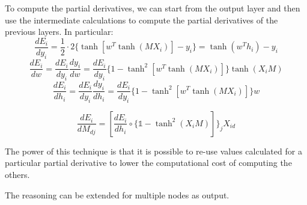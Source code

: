 To compute the partial derivatives, we can start from the output layer and then use the intermediate calculations to compute
the partial derivatives of the previous layers.
In particular:
$$ \frac{dE_i}{dy_i} = \frac{1}{2} \cdot 2 \{ \tanh[w^T \tanh(M X_i)] - y_i\} = \tanh(w^T h_i) - y_i $$
$$ \frac{dE_i}{dw} = \frac{dE_i}{dy_i} \frac{dy_i}{dw} = \frac{dE_i}{dy_i} \{1 - \tanh^2[w^T \tanh(M X_i)]\} \tanh(X_i M) $$
$$ \frac{dE_i}{dh_i} = \frac{dE_i}{dy_i} \frac{dy_i}{dh_i} = \frac{dE_i}{dy_i} \{1 - \tanh^2[w^T \tanh(M X_i)]\} w $$

$$ \frac{dE_i}{dM_{dj}} = [\frac{dE_i}{dh_i} \circ \{\mathbb{1} - \tanh^2(X_i M)]\}_j X_{id}$$

The power of this technique is that it is possible to re-use values calculated for a particular partial derivative to lower the computational cost of computing the others.

The reasoning can be extended for multiple nodes as output.